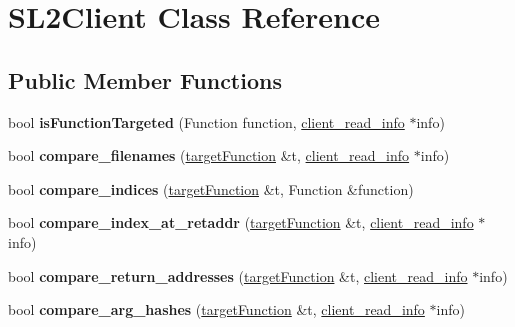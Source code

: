 \hypertarget{class_s_l2_client}{}\section{S\+L2\+Client Class Reference}
\label{class_s_l2_client}
\subsection*{Public Member Functions}
\begin{DoxyCompactItemize}
\item 
\mbox{\label{class_s_l2_client_afeda9fdf80de020f5b29a8398f0ed1b9}} 
bool {\bfseries is\+Function\+Targeted} (Function function, \mbox{\hyperlink{structclient__read__info}{client\+\_\+read\+\_\+info}} $\ast$info)
\item 
\mbox{\label{class_s_l2_client_af88ff86461f852e208017b35006eb6a2}} 
bool {\bfseries compare\+\_\+filenames} (\mbox{\hyperlink{structtarget_function}{target\+Function}} \&t, \mbox{\hyperlink{structclient__read__info}{client\+\_\+read\+\_\+info}} $\ast$info)
\item 
\mbox{\label{class_s_l2_client_afb8a8406ea4d1e2ec2308aadd86d5363}} 
bool {\bfseries compare\+\_\+indices} (\mbox{\hyperlink{structtarget_function}{target\+Function}} \&t, Function \&function)
\item 
\mbox{\label{class_s_l2_client_a3ce2e53c0c9e0966c3ec98c2d42cd0e3}} 
bool {\bfseries compare\+\_\+index\+\_\+at\+\_\+retaddr} (\mbox{\hyperlink{structtarget_function}{target\+Function}} \&t, \mbox{\hyperlink{structclient__read__info}{client\+\_\+read\+\_\+info}} $\ast$info)
\item 
\mbox{\label{class_s_l2_client_a064d5db38a3fd1785093efb70bfd27db}} 
bool {\bfseries compare\+\_\+return\+\_\+addresses} (\mbox{\hyperlink{structtarget_function}{target\+Function}} \&t, \mbox{\hyperlink{structclient__read__info}{client\+\_\+read\+\_\+info}} $\ast$info)
\item 
\mbox{\label{class_s_l2_client_a9f17b0cec83a094a3943459f647dd44f}} 
bool {\bfseries compare\+\_\+arg\+\_\+hashes} (\mbox{\hyperlink{structtarget_function}{target\+Function}} \&t, \mbox{\hyperlink{structclient__read__info}{client\+\_\+read\+\_\+info}} $\ast$info)

\end{DoxyCompactItemize}

